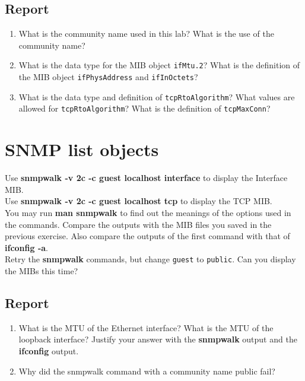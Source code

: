 \documentclass[10pt,a4paper]{article}
\numberwithin{equation}{section}
\numberwithin{figure}{section}
\numberwithin{table}{section}
\begin{document}
	\subsection*{Report}
	\begin{enumerate}
		\item What is the community name used in this lab? What is the use of the
		community name?
		\item What is the data type for the MIB object \texttt{ifMtu.2}? What is the definition of the MIB object \texttt{ifPhysAddress} and \texttt{ifInOctets}?
		\item What is the data type and definition of \texttt{tcpRtoAlgorithm}? What values are allowed for \texttt{tcpRtoAlgorithm}? What is the definition of \texttt{tcpMaxConn}?
	\end{enumerate}

\section{SNMP list objects}
	Use \textbf{snmpwalk -v 2c -c guest localhost interface} to display the Interface MIB.\\
	Use \textbf{snmpwalk -v 2c -c guest localhost tcp} to display the TCP MIB.\\
	You may run \textbf{man snmpwalk} to find out the meanings of the options used in the commands. Compare the outputs with the MIB files you saved in the previous exercise. Also compare the outputs of the first command with that of \textbf{ifconfig -a}.\\
	Retry the \textbf{snmpwalk} commands, but change \texttt{guest} to \texttt{public}. Can you display the MIBs this time?
	
	\subsection*{Report}
	\begin{enumerate}
		\item What is the MTU of the Ethernet interface? What is the MTU of the loopback interface? Justify your answer with the \textbf{snmpwalk} output and the \textbf{ifconfig} output.
		\item Why did the snmpwalk command with a community name public fail?
	\end{enumerate}
\end{document}
